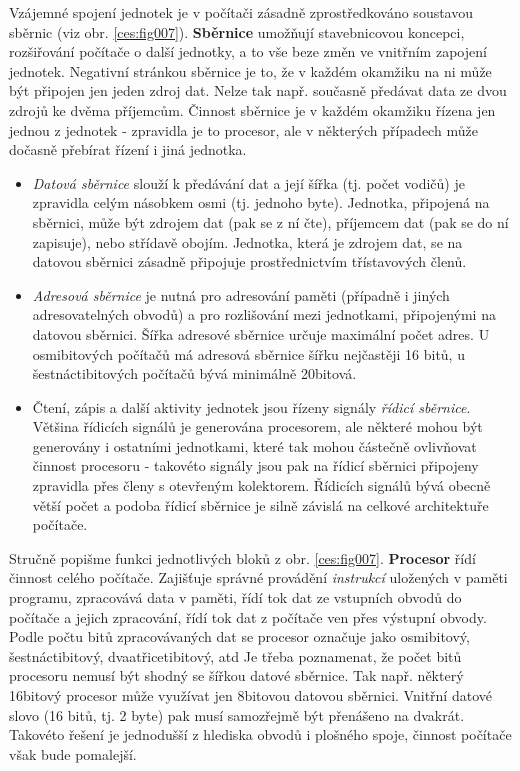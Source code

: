     Vzájemné spojení jednotek je v počítači zásadně zprostředkováno soustavou sběrnic (viz obr.
    \ref{ces:fig007}). \textbf{Sběrnice} umožňují stavebnicovou koncepci, rozšiřování počítače o
    další jednotky, a to vše beze změn ve vnitřním zapojení jednotek. Negativní stránkou sběrnice je
    to, že v každém okamžiku na ni může být připojen jen jeden zdroj dat. Nelze tak např. současně
    předávat data ze dvou zdrojů ke dvěma příjemcům. Činnost sběrnice je v každém okamžiku řízena
    jen jednou z jednotek - zpravidla je to procesor, ale v některých případech může dočasně
    přebírat řízení i jiná jednotka. 
    \begin{itemize}[noitemsep]
      \item \emph{Datová sběrnice} slouží k předávání dat a její šířka (tj. počet vodičů) je 
            zpravidla celým násobkem osmi (tj. jednoho byte). Jednotka, připojená na sběrnici, může 
            být zdrojem dat (pak se z ní čte), příjemcem dat (pak se do ní zapisuje), nebo střídavě 
            obojím. Jednotka, která je zdrojem dat, se na datovou sběrnici zásadně připojuje 
            prostřednictvím třístavových členů.
      
      \item \emph{Adresová sběrnice} je nutná pro adresování paměti (případně i jiných 
            adresovatelných obvodů) a pro rozlišování mezi jednotkami, připojenými na datovou 
            sběrnici. Šířka adresové sběrnice určuje maximální počet adres. U osmibitových počítačů 
            má adresová sběrnice šířku nejčastěji 16 bitů, u šestnáctibitových počítačů bývá 
            minimálně 20bitová.
      
      \item Čtení, zápis a další aktivity jednotek jsou řízeny signály \emph{řídicí sběrnice}. 
            Většina řídicích signálů je generována procesorem, ale některé mohou být generovány i 
            ostatními jednotkami, které tak mohou částečně ovlivňovat činnost procesoru - takovéto 
            signály jsou pak na řídicí sběrnici připojeny zpravidla přes členy s otevřeným 
            kolektorem. Řídicích signálů bývá obecně větší počet a podoba řídicí sběrnice je silně 
            závislá na celkové architektuře počítače.
    \end{itemize}
    
    Stručně popišme funkci jednotlivých bloků z obr. \ref{ces:fig007}. \textbf{Procesor} řídí
    činnost celého počítače. Zajišťuje správné provádění \emph{instrukcí} uložených v paměti
    programu, zpracovává data v paměti, řídí tok dat ze vstupních obvodů do počítače a jejich
    zpracování, řídí tok dat z počítače ven přes výstupní obvody. Podle počtu bitů zpracovávaných
    dat se procesor označuje jako osmibitový, šestnáctibitový, dvaatřicetibitový, atd Je třeba
    poznamenat, že počet bitů procesoru nemusí být shodný se šířkou datové sběrnice. Tak např.
    některý 16bitový procesor může využívat jen 8bitovou datovou sběrnici. Vnitřní datové slovo (16
    bitů, tj. 2 byte) pak musí samozřejmě být přenášeno na dvakrát. Takovéto řešení je jednodušší z
    hlediska obvodů i plošného spoje, činnost počítače však bude pomalejší.
    
